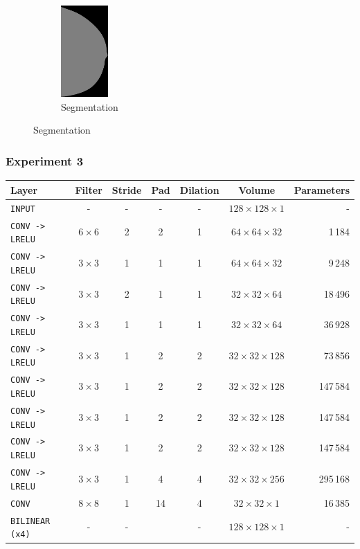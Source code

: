 \documentclass{beamer}
\begin{document}
\begin{frame}
\begin{figure}[h]
\begin{subfigure}{0.22\textwidth}
				\centering
					\includegraphics[height = 3.5cm]{plots/segmentation_ex2_v2.png}
				\caption{Segmentation}
			\end{subfigure}%
		\end{figure}		
	\end{frame}
	
	\begin{frame}
		\frametitle{Experiment 3}
		\footnotesize
		\begin{table}[h]
			\centering
			\begin{tabular}{lcccccr}
			\hline
			\textbf{Layer} & \textbf{Filter} & \textbf{Stride} & \textbf{Pad} & \textbf{Dilation} & \textbf{Volume} & \textbf{Parameters} \\
			\hline
			\texttt{INPUT}	&- & -	& - & - & $128 \times 128 \times 1$ & -\\
			\texttt{CONV -> LRELU}	& $6 \times 6$ & 2 & 2 & 1 & $64 \times 64 \times 32$ & 1\,184\\
			\texttt{CONV -> LRELU}	& $3 \times 3$ & 1 & 1 & 1 & $64 \times 64 \times 32$ & 9\,248\\
			\texttt{CONV -> LRELU}	& $3 \times 3$ & 2 & 1 & 1 & $32 \times 32 \times 64$ & 18\,496\\
			\texttt{CONV -> LRELU}	& $3 \times 3$ & 1 & 1 & 1 & $32 \times 32 \times 64$ & 36\,928\\
			\texttt{CONV -> LRELU}	& $3 \times 3$ & 1 & 2 & 2 & $32 \times 32 \times 128$ & 73\,856\\
			\texttt{CONV -> LRELU}	& $3 \times 3$ & 1 & 2 & 2 & $32 \times 32 \times 128$ & 147\,584\\
			\texttt{CONV -> LRELU}	& $3 \times 3$ & 1 & 2 & 2 & $32 \times 32 \times 128$ & 147\,584\\
			\texttt{CONV -> LRELU}	& $3 \times 3$ & 1 & 2 & 2 & $32 \times 32 \times 128$ & 147\,584\\
			\texttt{CONV -> LRELU}	& $3 \times 3$ & 1 & 4 & 4 & $32 \times 32 \times 256$ & 295\,168\\
			\texttt{CONV}	& $8 \times 8$ & 1 & 14 & 4 & $32 \times 32 \times 1$ & 16\,385\\
			\texttt{BILINEAR (x4)}		& - & - && - & $128 \times 128 \times 1$ & -\\
			\hline
			\end{tabular}
		\end{table}
		

\end{frame}
\end{document}
